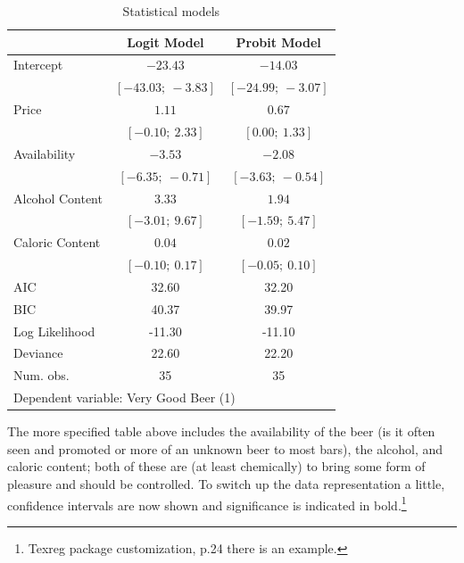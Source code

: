 \documentclass[12pt]{article}\usepackage[]{graphicx}\usepackage[]{color}
\begin{document}
\begin{flushleft}
\begin{table}[h!]
\caption{Statistical models}
\begin{center}
\begin{tabular}{l c c }
\hline
 & Logit Model & Probit Model \\
\hline
Intercept       & $\mathbf{-23.43}$ & $\mathbf{-14.03}$ \\
                & $[-43.03;\ -3.83]$    & $[-24.99;\ -3.07]$    \\
Price           & $1.11$                & $\mathbf{0.67}$   \\
                & $[-0.10;\ 2.33]$      & $[0.00;\ 1.33]$       \\
Availability    & $\mathbf{-3.53}$  & $\mathbf{-2.08}$  \\
                & $[-6.35;\ -0.71]$     & $[-3.63;\ -0.54]$     \\
Alcohol Content & $3.33$                & $1.94$                \\
                & $[-3.01;\ 9.67]$      & $[-1.59;\ 5.47]$      \\
Caloric Content & $0.04$                & $0.02$                \\
                & $[-0.10;\ 0.17]$      & $[-0.05;\ 0.10]$      \\
\hline
AIC             & 32.60                 & 32.20                 \\
BIC             & 40.37                 & 39.97                 \\
Log Likelihood  & -11.30                & -11.10                \\
Deviance        & 22.60                 & 22.20                 \\
Num. obs.       & 35                    & 35                    \\
\hline
\multicolumn{3}{l}{\scriptsize{Dependent variable: Very Good Beer (1)}}
\end{tabular}
\end{center}
\end{table}


The more specified table above includes the availability of the beer (is it often seen and promoted or more of an unknown beer to most bars), the alcohol, and caloric content; both of these are (at least chemically) to bring some form of pleasure and should be controlled. To switch up the data representation a little, confidence intervals are now shown and significance is indicated in bold.\footnote{ Texreg package customization, p.24 there is an example.} 


\end{flushleft}
\end{document}
